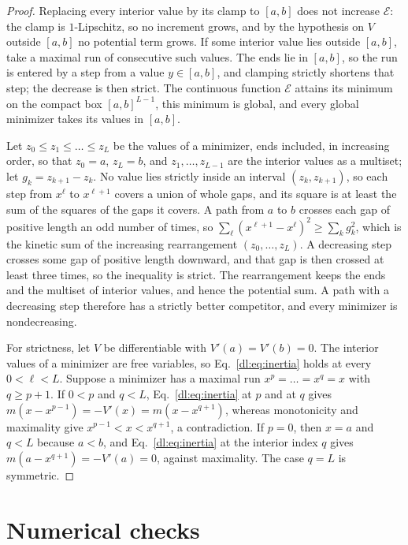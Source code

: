 \documentclass[11pt]{article}
\theoremstyle{definition}
\theoremstyle{remark}
\begin{document}
\begin{proof}
Replacing every interior value by its clamp to $[a,b]$ does not increase $\mathcal E$: the clamp is $1$-Lipschitz, so no increment grows, and by the hypothesis on $V$ outside $[a,b]$ no potential term grows. If some interior value lies outside $[a,b]$, take a maximal run of consecutive such values. The ends lie in $[a,b]$, so the run is entered by a step from a value $y\in[a,b]$, and clamping strictly shortens that step; the decrease is then strict. The continuous function $\mathcal E$ attains its minimum on the compact box $[a,b]^{L-1}$, this minimum is global, and every global minimizer takes its values in $[a,b]$.

Let $z_0\le z_1\le\dots\le z_L$ be the values of a minimizer, ends included, in increasing order, so that $z_0=a$, $z_L=b$, and $z_1,\dots,z_{L-1}$ are the interior values as a multiset; let $g_k=z_{k+1}-z_k$. No value lies strictly inside an interval $(z_k,z_{k+1})$, so each step from $x^\ell$ to $x^{\ell+1}$ covers a union of whole gaps, and its square is at least the sum of the squares of the gaps it covers. A path from $a$ to $b$ crosses each gap of positive length an odd number of times, so $\sum_\ell(x^{\ell+1}-x^\ell)^2\ge\sum_kg_k^2$, which is the kinetic sum of the increasing rearrangement $(z_0,\dots,z_L)$. A decreasing step crosses some gap of positive length downward, and that gap is then crossed at least three times, so the inequality is strict. The rearrangement keeps the ends and the multiset of interior values, and hence the potential sum. A path with a decreasing step therefore has a strictly better competitor, and every minimizer is nondecreasing.

For strictness, let $V$ be differentiable with $V'(a)=V'(b)=0$. The interior values of a minimizer are free variables, so Eq.~\eqref{dl:eq:inertia} holds at every $0<\ell<L$. Suppose a minimizer has a maximal run $x^p=\dots=x^q=x$ with $q\ge p+1$. If $0<p$ and $q<L$, Eq.~\eqref{dl:eq:inertia} at $p$ and at $q$ gives $m(x-x^{p-1})=-V'(x)=m(x-x^{q+1})$, whereas monotonicity and maximality give $x^{p-1}<x<x^{q+1}$, a contradiction. If $p=0$, then $x=a$ and $q<L$ because $a<b$, and Eq.~\eqref{dl:eq:inertia} at the interior index $q$ gives $m(a-x^{q+1})=-V'(a)=0$, against maximality. The case $q=L$ is symmetric.
\end{proof}

\section{Numerical checks}
\label{dl:app:checks}
\end{document}
